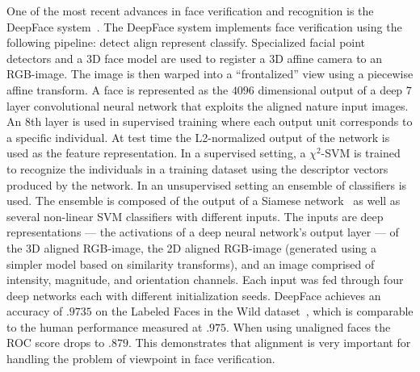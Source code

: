         One of the most recent advances in face verification and recognition is the DeepFace
        system~\cite{taigman_deepface_2014}. The DeepFace system implements face verification using the following
        pipeline: detect \rpipe{} align \rpipe{} represent \rpipe{} classify. Specialized facial point detectors and a
        3D face model are used to register a 3D affine camera to an RGB-image. The image is then warped into a
        ``frontalized'' view using a piecewise affine transform. A face is represented as the $4096$ dimensional output
        of a deep $7$ layer convolutional neural network that exploits the aligned nature input images. An 8th layer is
        used in supervised training where each output unit corresponds to a specific individual.
        At test time the L2-normalized output of the network is used as the feature representation. In a supervised
        setting, a $\chi^2$-SVM is trained to recognize the individuals in a training dataset using the descriptor
        vectors produced by the network. In an unsupervised setting an ensemble of classifiers is used. The ensemble is
        composed of the output of a Siamese network~\cite{chopra_learning_2005} as well as several non-linear SVM
        classifiers with different inputs. The inputs are deep representations --- the activations of a deep neural
        network's output layer --- of the 3D aligned RGB-image, the 2D aligned RGB-image (generated using a simpler
        model based on similarity transforms), and an image comprised of intensity, magnitude, and orientation channels.
        Each input was fed through four deep networks each with different initialization seeds.
        DeepFace achieves an accuracy of $.9735$ on the Labeled Faces in the Wild dataset~\cite{huang_labeled_2007},
        which is comparable to the human performance measured at $.975$. When using unaligned faces the ROC score drops
        to $.879$. This demonstrates that alignment is very important for handling the problem of viewpoint in face
        verification.

